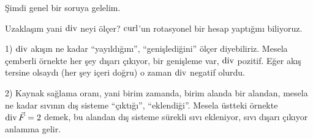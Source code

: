 \documentclass[12pt,fleqn]{article}\usepackage{../../common}
\begin{document}
Şimdi genel bir soruya gelelim. 

Uzaklaşım yani $\operatorname{div}$ neyi ölçer? $\operatorname{curl}$'un rotasyonel bir hesap yaptığını
biliyoruz.

1) $\operatorname{div}$ akışın ne kadar ``yayıldığını'', ``genişlediğini'' ölçer
diyebiliriz. Mesela çemberli örnekte her şey dışarı çıkıyor, bir genişleme var,
$\operatorname{div}$ pozitif. Eğer akış tersine olsaydı (her şey içeri doğru) o zaman $\operatorname{div}$
negatif olurdu.

2) Kaynak sağlama oranı, yani birim zamanda, birim alanda bir alandan,
mesela ne kadar sıvının dış sisteme ``çıktığı'', ``eklendiği''. Mesela
üstteki örnekte $\operatorname{div} \vec{F} = 2$ demek, bu alandan dış sisteme sürekli
sıvı ekleniyor, sıvı dışarı çıkıyor anlamına gelir.
\end{document}
